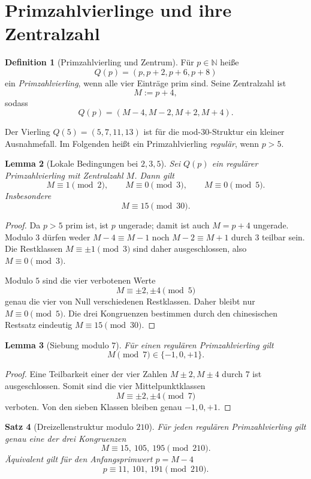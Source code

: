\documentclass[11pt,a4paper]{article}
\newtheorem{satz}{Satz}[section]
\newtheorem{lemma}[satz]{Lemma}
\theoremstyle{definition}
\newtheorem{definition}[satz]{Definition}
\theoremstyle{remark}
\newcommand{\N}{\mathbb N}
\begin{document}
\section{Primzahlvierlinge und ihre Zentralzahl}

\begin{definition}[Primzahlvierling und Zentrum]
Für $p\in\N$ heiße
\[
Q(p)=(p,p+2,p+6,p+8)
\]
ein \emph{Primzahlvierling}, wenn alle vier Einträge prim sind. Seine Zentralzahl ist
\[
M:=p+4,
\]
sodass
\[
Q(p)=(M-4,M-2,M+2,M+4).
\]
\end{definition}

Der Vierling $Q(5)=(5,7,11,13)$ ist für die mod-$30$-Struktur ein kleiner Ausnahmefall. Im Folgenden heißt ein Primzahlvierling \emph{regulär}, wenn $p>5$.

\begin{lemma}[Lokale Bedingungen bei $2,3,5$]\label{lem:235}
Sei $Q(p)$ ein regulärer Primzahlvierling mit Zentralzahl $M$. Dann gilt
\[
M\equiv1\pmod2,\qquad M\equiv0\pmod3,\qquad M\equiv0\pmod5.
\]
Insbesondere
\[
\boxed{M\equiv15\pmod{30}.}
\]
\end{lemma}

\begin{proof}
Da $p>5$ prim ist, ist $p$ ungerade; damit ist auch $M=p+4$ ungerade. Modulo $3$ dürfen weder $M-4\equiv M-1$ noch $M-2\equiv M+1$ durch $3$ teilbar sein. Die Restklassen $M\equiv\pm1\pmod3$ sind daher ausgeschlossen, also $M\equiv0\pmod3$.

Modulo $5$ sind die vier verbotenen Werte
\[
M\equiv\pm2,\pm4\pmod5
\]
genau die vier von Null verschiedenen Restklassen. Daher bleibt nur $M\equiv0\pmod5$. Die drei Kongruenzen bestimmen durch den chinesischen Restsatz eindeutig $M\equiv15\pmod{30}$.
\end{proof}

\begin{lemma}[Siebung modulo $7$]\label{lem:7}
Für einen regulären Primzahlvierling gilt
\[
\boxed{M\pmod7\in\{-1,0,+1\}.}
\]
\end{lemma}

\begin{proof}
Eine Teilbarkeit einer der vier Zahlen $M\pm2,M\pm4$ durch $7$ ist ausgeschlossen. Somit sind die vier Mittelpunktklassen
\[
M\equiv\pm2,\pm4\pmod7
\]
verboten. Von den sieben Klassen bleiben genau $-1,0,+1$.
\end{proof}

\begin{satz}[Dreizellenstruktur modulo $210$]\label{thm:210}
Für jeden regulären Primzahlvierling gilt genau eine der drei Kongruenzen
\[
\boxed{M\equiv15,\ 105,\ 195\pmod{210}.}
\]
Äquivalent gilt für den Anfangsprimwert $p=M-4$
\[
\boxed{p\equiv11,\ 101,\ 191\pmod{210}.}
\]
\end{satz}
\end{document}
